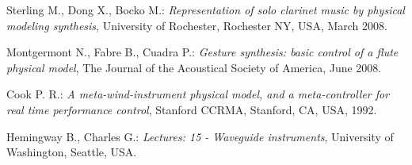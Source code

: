 \documentclass[nostrict]{szablonPG}
\begin{document}
\begin{thebibliography}{20}
		Sterling M., Dong X., Bocko M.: \emph{Representation of solo clarinet music by physical modeling synthesis}, University of Rochester, Rochester NY, USA, March 2008.
		
		Montgermont N., Fabre B., Cuadra P.: \emph{Gesture synthesis: basic control of a flute physical model}, The Journal of the Acoustical Society of America, June 2008.
		
		Cook P. R.: \emph{A meta-wind-instrument physical model, and a meta-controller for real time performance control}, Stanford CCRMA, Stanford, CA, USA, 1992.
		
		Hemingway B., Charles G.: \emph{Lectures: 15 - Waveguide instruments}, University of Washington, Seattle, USA.
	\end{thebibliography}
	
\end{document}
